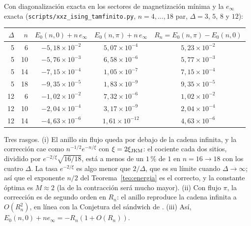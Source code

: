 \documentclass[11pt,a4paper]{article}
\theoremstyle{remark}
\begin{document}
Con diagonalización exacta en los sectores de magnetización mínima y la $e_\infty$ exacta
(\texttt{scripts/xxz\_ising\_tamfinito.py}, $n=4,\dots,18$ par, $\Delta=3$, $5$, $8$ y $12$):
\begin{center}\small
\begin{tabular}{rrccc}
\toprule
$\Delta$ & $n$ & $E_0(n,0)+n\,e_\infty$ & $E_0(n,\pi)+n\,e_\infty$ & $R_n=E_0(n,\pi)-E_0(n,0)$\\
\midrule
5 & 6 & $-5{,}18\times10^{-2}$ & $5{,}07\times10^{-4}$ & $5{,}23\times10^{-2}$\\
5 & 10 & $-5{,}76\times10^{-3}$ & $6{,}58\times10^{-6}$ & $5{,}77\times10^{-3}$\\
5 & 14 & $-7{,}15\times10^{-4}$ & $1{,}05\times10^{-7}$ & $7{,}15\times10^{-4}$\\
5 & 18 & $-9{,}35\times10^{-5}$ & $1{,}83\times10^{-9}$ & $9{,}35\times10^{-5}$\\
12 & 6 & $-1{,}02\times10^{-2}$ & $7{,}32\times10^{-6}$ & $1{,}02\times10^{-2}$\\
12 & 10 & $-2{,}04\times10^{-4}$ & $3{,}17\times10^{-9}$ & $2{,}04\times10^{-4}$\\
12 & 14 & $-4{,}63\times10^{-6}$ & $1{,}61\times10^{-12}$ & $4{,}63\times10^{-6}$\\
\bottomrule
\end{tabular}
\end{center}
Tres rasgos. (i) El anillo sin flujo queda por debajo de la cadena infinita, y la corrección cae
como $n^{-1/2}e^{-n/\xi}$ con $\xi=2\xi_{\rm JKM}$: el cociente cada dos sitios, dividido por
$e^{-2/\xi}\sqrt{16/18}$, está a menos de un $1$\,\% de $1$ en $n=16\to18$ con los cuatro $\Delta$. La
tasa $e^{-2/\xi}$ es algo menor que $2/\Delta$, que es su límite cuando $\Delta\to\infty$; así que el
exponente $n/2$ del Teorema~\ref{teo:energia} es el correcto, y la constante óptima es $M\approx2$
(la de la contracción será mucho mayor). (ii) Con flujo $\pi$, la
corrección es de segundo orden en $R_n$: el anillo reproduce la cadena infinita a $O(R_n^2)$, en
línea con la Conjetura del sándwich de \cite{robustez}. (iii) Así, $E_0(n,0)+n e_\infty=-R_n(1+O(R_n))$.
\end{document}
